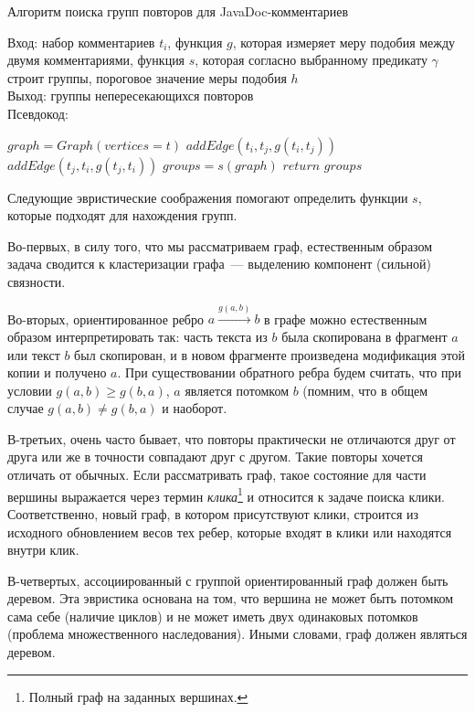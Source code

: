 \begin{algorithm}[t!]
\caption{Алгоритм поиска групп повторов для JavaDoc-комментариев}\label{alg:groupDuplicate}
Вход: набор комментариев $t_{i}$, функция $g$, которая измеряет меру подобия между двумя комментариями, функция $s$, которая согласно выбранному предикату $\gamma$ строит группы, пороговое значение меры подобия $h$\\
Выход: группы непересекающихся повторов\\
Псевдокод:
\begin{algorithmic}[1]
\State $graph = Graph(vertices=t)$
\State $addEdge(t_{i},t_{j},g(t_{i},t_{j}))$
\EndIf
{}
\State $addEdge(t_{j},t_{i},g(t_{j},t_{i}))$
\EndIf
\EndFor
\EndFor
\State $groups = s(graph)$
\State $return$ $groups$
\end{algorithmic}
\end{algorithm}


Следующие эвристические соображения помогают определить функции $s$, которые подходят для нахождения групп.

Во-первых, в силу того, что мы рассматриваем граф, естественным образом задача сводится к кластеризации графа~--- выделению компонент (сильной) связности.

Во-вторых, ориентированное ребро $a \xrightarrow{g(a,b)} b$ в графе можно естественным образом интерпретировать так: часть текста из $b$ была скопирована в фрагмент $a$ или текст $b$ был скопирован, и в новом фрагменте произведена модификация этой копии и получено $a$.
При существовании обратного ребра будем считать, что при условии $g(a,b)\geq g(b,a)$, $a$ является потомком $b$ (помним, что в общем случае $g(a,b)\neq g(b,a)$ и наоборот.

В-третьих, очень часто бывает, что повторы практически не отличаются друг от друга или же в точности совпадают друг с другом.
Такие повторы хочется отличать от обычных.
Если рассматривать граф, такое состояние для части вершины выражается через термин \emph{клика}\footnote{Полный граф на заданных вершинах.} и относится к задаче поиска клики.
Соответственно, новый граф, в котором присутствуют клики, строится из исходного обновлением весов тех ребер, которые входят в клики или находятся внутри клик.

В-четвертых, ассоциированный с группой ориентированный граф должен быть деревом.
Эта эвристика основана на том, что вершина не может быть потомком сама себе (наличие циклов) и не может иметь двух одинаковых потомков (проблема множественного наследования).
Иными словами, граф должен являться деревом.

